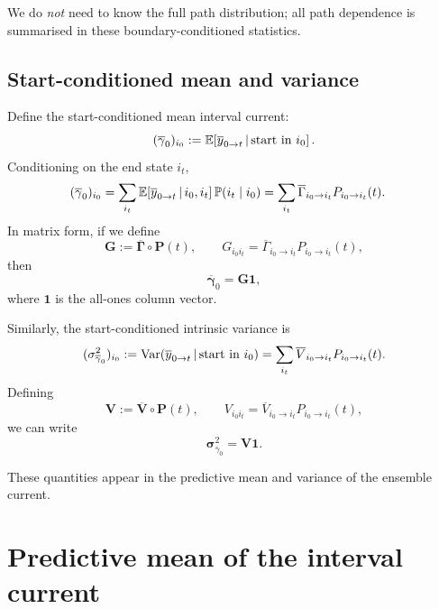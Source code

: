 \documentclass[11pt]{article}
\begin{document}
We do \emph{not} need to know the full path distribution; all path dependence is
summarised in these boundary-conditioned statistics.

\subsection{Start-conditioned mean and variance}

Define the start-conditioned mean interval current:
\[
  (\overline{\gamma}_0)_{i_0}
  :=
  \mathbb{E}\!\left[
    \overline{y}_{0\to t}
    \,\middle|\,
    \text{start in } i_0
  \right].
\]
Conditioning on the end state \(i_t\),
\begin{align}
  (\overline{\gamma}_0)_{i_0}
  &=
  \sum_{i_t}
  \mathbb{E}\!\left[
    \overline{y}_{0\to t}
    \,\middle|\,
    i_0,i_t
  \right]
  \mathbb{P}(i_t\mid i_0)
  =
  \sum_{i_t}
  \overline{\Gamma}_{i_0\to i_t}
  P_{i_0\to i_t}(t).
\end{align}
In matrix form, if we define
\[
  \mathbf{G}
  := \overline{\mathbf{\Gamma}}\circ \mathbf{P}(t),
  \qquad
  G_{i_0 i_t}
  = \overline{\Gamma}_{i_0\to i_t}P_{i_0\to i_t}(t),
\]
then
\[
  \overline{\boldsymbol{\gamma}}_0
  = \mathbf{G}\mathbf{1},
\]
where \(\mathbf{1}\) is the all-ones column vector.

Similarly, the start-conditioned intrinsic variance is
\[
  (\sigma^2_{\overline{\gamma}_0})_{i_0}
  :=
  \operatorname{Var}\!\left(
    \overline{y}_{0\to t}
    \,\middle|\,
    \text{start in } i_0
  \right)
  =
  \sum_{i_t}
  \overline{V}_{i_0\to i_t}P_{i_0\to i_t}(t).
\]
Defining
\[
  \mathbf{V}
  := \overline{\mathbf{V}}\circ \mathbf{P}(t),
  \qquad
  V_{i_0 i_t}
  = \overline{V}_{i_0\to i_t}P_{i_0\to i_t}(t),
\]
we can write
\[
  \boldsymbol{\sigma}^2_{\overline{\gamma}_0}
  = \mathbf{V}\mathbf{1}.
\]

These quantities appear in the predictive mean and variance of the ensemble
current.


\section{Predictive mean of the interval current}
\end{document}
